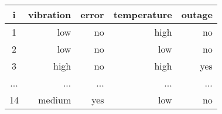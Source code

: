 \begin{tabular}{crrrr}
\toprule
   i & vibration & error & temperature & outage \\
\midrule
   1 &       low &    no &        high &     no \\
   2 &       low &    no &         low &     no \\
   3 &      high &    no &        high &    yes \\
 ... &       ... &   ... &         ... &    ... \\
  14 &    medium &   yes &         low &     no \\
\bottomrule
\end{tabular}
